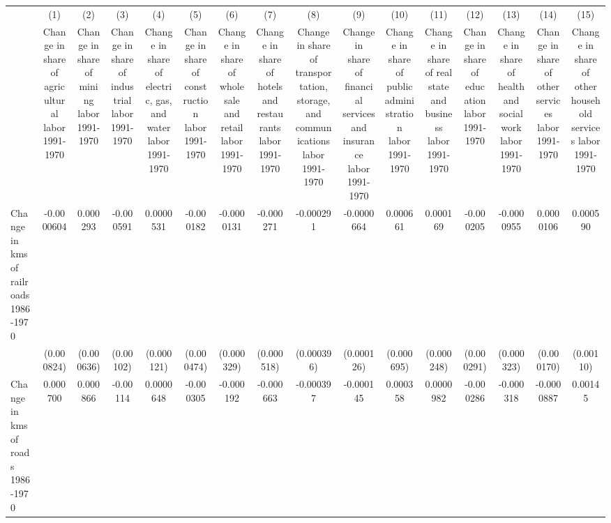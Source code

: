 {
\def\sym#1{\ifmmode^{#1}\else\(^{#1}\)\fi}
\begin{tabular}{l*{15}{c}}
\hline\hline
                &\multicolumn{1}{c}{(1)}&\multicolumn{1}{c}{(2)}&\multicolumn{1}{c}{(3)}&\multicolumn{1}{c}{(4)}&\multicolumn{1}{c}{(5)}&\multicolumn{1}{c}{(6)}&\multicolumn{1}{c}{(7)}&\multicolumn{1}{c}{(8)}&\multicolumn{1}{c}{(9)}&\multicolumn{1}{c}{(10)}&\multicolumn{1}{c}{(11)}&\multicolumn{1}{c}{(12)}&\multicolumn{1}{c}{(13)}&\multicolumn{1}{c}{(14)}&\multicolumn{1}{c}{(15)}\\
                &\multicolumn{1}{c}{Change in share of agricultural labor 1991-1970}&\multicolumn{1}{c}{Change in share of mining labor 1991-1970}&\multicolumn{1}{c}{Change in share of industrial labor 1991-1970}&\multicolumn{1}{c}{Change in share of electric, gas, and water labor 1991-1970}&\multicolumn{1}{c}{Change in share of construction labor 1991-1970}&\multicolumn{1}{c}{Change in share of wholesale and retail labor 1991-1970}&\multicolumn{1}{c}{Change in share of hotels and restaurants labor 1991-1970}&\multicolumn{1}{c}{Change in share of transportation, storage, and communications labor 1991-1970}&\multicolumn{1}{c}{Change in share of financial services and insurance labor 1991-1970}&\multicolumn{1}{c}{Change in share of public administration labor 1991-1970}&\multicolumn{1}{c}{Change in share of real state and business labor 1991-1970}&\multicolumn{1}{c}{Change in share of education labor 1991-1970}&\multicolumn{1}{c}{Change in share of health and social work labor 1991-1970}&\multicolumn{1}{c}{Change in share of other services labor 1991-1970}&\multicolumn{1}{c}{Change in share of other household services labor 1991-1970}\\
\hline
Change in kms of railroads 1986-1970&-0.0000604         & 0.000293         &-0.000591         &0.0000531         &-0.000182         &-0.0000131         &-0.000271         &-0.000291         &-0.0000664         & 0.000661         & 0.000169         &-0.000205         &-0.0000955         &0.0000106         & 0.000590         \\
                &(0.000824)         &(0.000636)         &(0.00102)         &(0.000121)         &(0.000474)         &(0.000329)         &(0.000518)         &(0.000396)         &(0.000126)         &(0.000695)         &(0.000248)         &(0.000291)         &(0.000323)         &(0.000170)         &(0.00110)         \\
[1em]
Change in kms of roads 1986-1970& 0.000700         & 0.000866         & -0.00114         &0.0000648         &-0.000305         &-0.000192         &-0.000663         &-0.000397         &-0.000145         & 0.000358         &0.0000982         &-0.000286         &-0.000318         &-0.0000887         &  0.00145         \\

\end{tabular}}
